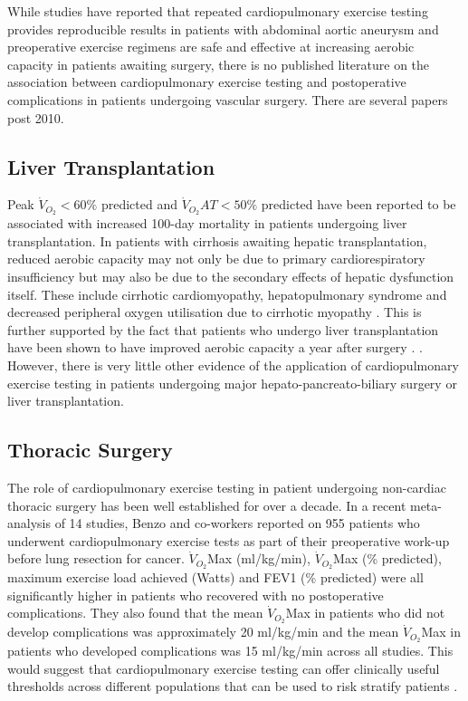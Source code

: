 While studies have reported that repeated cardiopulmonary exercise testing provides reproducible results in patients with abdominal aortic aneurysm and preoperative exercise regimens are safe and effective at increasing aerobic capacity in patients awaiting surgery, there is no published literature on the association between cardiopulmonary exercise testing and postoperative complications in patients undergoing vascular surgery. %
There are several papers post 2010. 

\subsection{Liver Transplantation}
Peak $\dot{V}_{O_2}<60\%$ predicted and $\dot{V}_{O_2}AT<50\%$ predicted have been reported to be associated with increased 100-day mortality in patients undergoing liver transplantation. 
In patients with cirrhosis awaiting hepatic transplantation, reduced aerobic capacity may not only be due to primary cardiorespiratory insufficiency but may also be due to the secondary effects of hepatic dysfunction itself. 
These include cirrhotic cardiomyopathy, hepatopulmonary syndrome and decreased peripheral oxygen utilisation due to cirrhotic myopathy \parencite{epstein_aerobic_2004}. 
This is further supported by the fact that patients who undergo liver transplantation have been shown to have improved aerobic capacity a year after surgery \parencite{iscar_functional_2009}. . 
However, there is very little other evidence of the application of cardiopulmonary exercise testing in patients undergoing major hepato-pancreato-biliary surgery or liver transplantation.

\subsection{Thoracic Surgery}
The role of cardiopulmonary exercise testing in patient undergoing non-cardiac thoracic surgery has been well established for over a decade. 
In a recent meta-analysis of 14 studies, Benzo and co-workers reported on 955 patients who underwent cardiopulmonary exercise tests as part of their preoperative work-up before lung resection for cancer. $\dot{V}_{O_2}$Max (ml/kg/min), $\dot{V}_{O_2}$Max (\% predicted), maximum exercise load achieved (Watts) and FEV1 (\% predicted) were all significantly higher in patients who recovered with no postoperative complications. 
They also found that the mean $\dot{V}_{O_2}$Max in patients who did not develop complications was approximately 20 ml/kg/min and the mean $\dot{V}_{O_2}$Max in patients who developed complications was 15 ml/kg/min across all studies. 
This would suggest that cardiopulmonary exercise testing can offer clinically useful thresholds across different populations that can be used to risk stratify patients \parencite{benzo_complications_2007}. 

